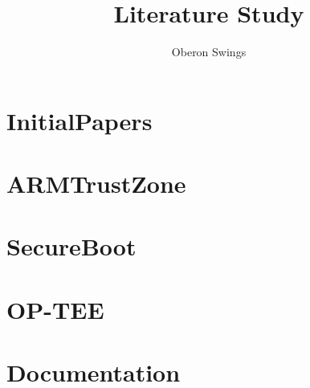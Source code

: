 \documentclass{report}
\title{Literature Study}
\author{Oberon Swings}
\begin{document}
\begin{titlepage}
\maketitle
\thispagestyle{empty}
\end{titlepage}

\tableofcontents
\newpage
{}

\chapter{InitialPapers}















\chapter{ARMTrustZone}





\chapter{SecureBoot}





\chapter{OP-TEE}



\chapter{Documentation}


\end{document}
